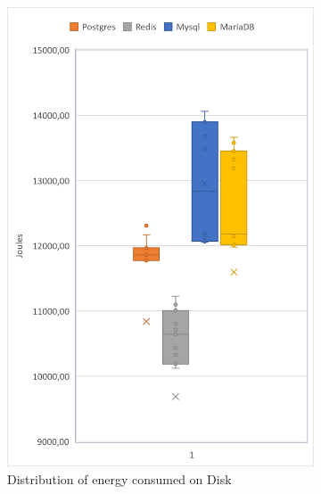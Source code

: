 \begin{figure}[h]
\begin{subfigure}[b]{0.33\textwidth}
            \includegraphics[width=1\columnwidth]{results/boxplot/10m/Disk.png}
            \caption[Distribution of energy consumed on Disk]%
            {{\small Distribution of energy consumed on Disk}}    
            \label{fig:bocplotyenergydisk10m}
        \end{subfigure}
        \begin{subfigure}[b]{0.33\textwidth}   
            \centering 

\end{subfigure}
\end{figure}
